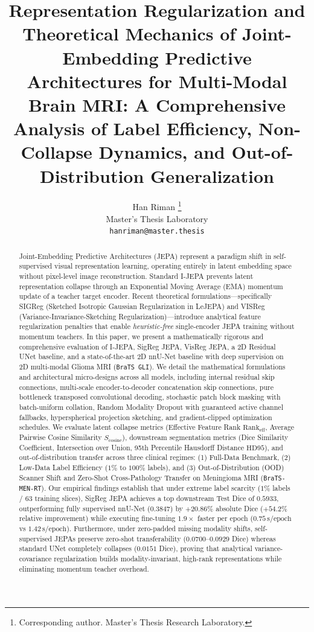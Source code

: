 \documentclass{article}
\title{Representation Regularization and Theoretical Mechanics of Joint-Embedding Predictive Architectures for Multi-Modal Brain MRI: A Comprehensive Analysis of Label Efficiency, Non-Collapse Dynamics, and Out-of-Distribution Generalization}
\author{%
  Han Riman \thanks{Corresponding author. Master's Thesis Research Laboratory.} \\
  Master's Thesis Laboratory \\
  \texttt{hanriman@master.thesis} \\
}
\begin{document}
\maketitle

\begin{abstract}
Joint-Embedding Predictive Architectures (JEPA) represent a paradigm shift in self-supervised visual representation learning, operating entirely in latent embedding space without pixel-level image reconstruction. Standard I-JEPA prevents latent representation collapse through an Exponential Moving Average (EMA) momentum update of a teacher target encoder. Recent theoretical formulations—specifically SIGReg (Sketched Isotropic Gaussian Regularization in LeJEPA) and VISReg (Variance-Invariance-Sketching Regularization)—introduce analytical feature regularization penalties that enable \emph{heuristic-free} single-encoder JEPA training without momentum teachers. In this paper, we present a mathematically rigorous and comprehensive evaluation of I-JEPA, SigReg JEPA, VisReg JEPA, a 2D Residual UNet baseline, and a state-of-the-art 2D nnU-Net baseline with deep supervision on 2D multi-modal Glioma MRI (\texttt{BraTS GLI}). We detail the mathematical formulations and architectural micro-designs across all models, including internal residual skip connections, multi-scale encoder-to-decoder concatenation skip connections, pure bottleneck transposed convolutional decoding, stochastic patch block masking with batch-uniform collation, Random Modality Dropout with guaranteed active channel fallbacks, hyperspherical projection sketching, and gradient-clipped optimization schedules. We evaluate latent collapse metrics (Effective Feature Rank $\text{Rank}_{\text{eff}}$, Average Pairwise Cosine Similarity $S_{\text{cosine}}$), downstream segmentation metrics (Dice Similarity Coefficient, Intersection over Union, 95th Percentile Hausdorff Distance $\text{HD95}$), and out-of-distribution transfer across three clinical regimes: (1) Full-Data Benchmark, (2) Low-Data Label Efficiency ($1\%$ to $100\%$ labels), and (3) Out-of-Distribution (OOD) Scanner Shift and Zero-Shot Cross-Pathology Transfer on Meningioma MRI (\texttt{BraTS-MEN-RT}). Our empirical findings establish that under extreme label scarcity ($1\%$ labels / $63$ training slices), SigReg JEPA achieves a top downstream Test Dice of $0.5933$, outperforming fully supervised nnU-Net ($0.3847$) by $+20.86\%$ absolute Dice ($+54.2\%$ relative improvement) while executing fine-tuning $1.9\times$ faster per epoch ($0.75\,\text{s/epoch}$ vs $1.42\,\text{s/epoch}$). Furthermore, under zero-padded missing modality shifts, self-supervised JEPAs preserve zero-shot transferability ($0.0700$--$0.0929$ Dice) whereas standard UNet completely collapses ($0.0151$ Dice), proving that analytical variance-covariance regularization builds modality-invariant, high-rank representations while eliminating momentum teacher overhead.
\end{abstract}
\end{document}
